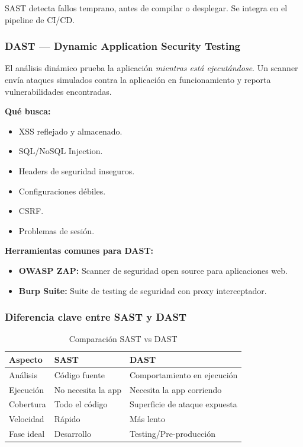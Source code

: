 SAST detecta fallos temprano, antes de compilar o desplegar. Se integra en el pipeline de CI/CD.

\subsubsection{DAST --- Dynamic Application Security Testing}

El análisis dinámico prueba la aplicación \textit{mientras está ejecutándose}. Un scanner envía ataques simulados contra la aplicación en funcionamiento y reporta vulnerabilidades encontradas.

\textbf{Qué busca:}
\begin{itemize}
    \item XSS reflejado y almacenado.
    \item SQL/NoSQL Injection.
    \item Headers de seguridad inseguros.
    \item Configuraciones débiles.
    \item CSRF.
    \item Problemas de sesión.
\end{itemize}

\textbf{Herramientas comunes para DAST:}
\begin{itemize}
    \item \textbf{OWASP ZAP:} Scanner de seguridad open source para aplicaciones web.
    \item \textbf{Burp Suite:} Suite de testing de seguridad con proxy interceptador.
\end{itemize}

\subsubsection{Diferencia clave entre SAST y DAST}

\begin{table}[h]
\centering
\small
\begin{tabular}{|l|l|l|}
\hline
\textbf{Aspecto} & \textbf{SAST} & \textbf{DAST} \\
\hline
Análisis & Código fuente & Comportamiento en ejecución \\
Ejecución & No necesita la app & Necesita la app corriendo \\
Cobertura & Todo el código & Superficie de ataque expuesta \\
Velocidad & Rápido & Más lento \\
Fase ideal & Desarrollo & Testing/Pre-producción \\
\hline
\end{tabular}
\caption{Comparación SAST vs DAST}
\label{tab:sast-dast}
\end{table}


